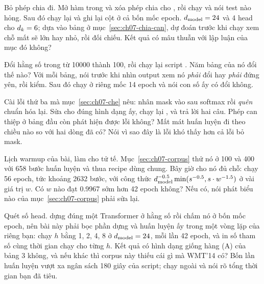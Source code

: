 \begin{bt}
  \item Bỏ phép chia đi. Mở hàm  trong
     và xóa phép chia cho , rồi
    chạy  và nói test nào hỏng.
    Sau đó chạy lại  và ghi lại cột  ở cả bốn
    mốc epoch. \(d_{\mathrm{model}} = 24\) và 4 head cho \(d_{k} = 6\); dựa vào bảng ở
    mục~\ref{sec:ch07-chia-can}, dự đoán trước khi chạy xem chỗ mất sẽ lớn hay
    nhỏ, rồi đối chiếu. Kết quả có mâu thuẫn với lập luận của mục đó không?

  \item Đổi hằng số  trong  từ 10000 thành
    100, rồi chạy lại script . Năm bảng của nó đổi thế
    nào? Với mỗi bảng, nói trước khi nhìn output xem nó \emph{phải} đổi hay
    \emph{phải} đứng yên, rồi kiểm. Sau đó chạy  ở riêng
    mốc 14 epoch và nói con số ấy có đổi không.

  \item Cài lỗi thứ ba mà mục~\ref{sec:ch07-che} nêu: nhân mask vào sau softmax
    rồi \emph{quên} chuẩn hóa lại. Sửa  cho đúng
    hình dạng ấy, chạy lại , và trả lời hai câu. Phép can
    thiệp ở bảng đầu còn phát hiện được lỗi không? Mất mát huấn luyện đi theo
    chiều nào so với hai dòng đã có? Nói vì sao đây là lỗi khó thấy hơn cả lỗi
    bỏ mask.

  \item Lịch warmup của bài, làm cho tử tế. Mục~\ref{sec:ch07-corpus} thử nó ở
     100 và 400 với 658 bước huấn luyện và thua recipe dùng chung.
    Bây giờ cho nó đủ chỗ: chạy 56 epoch, tức khoảng 2632 bước, với công thức
    \(d_{\mathrm{model}}^{-0.5}\min(s^{-0.5}, s \cdot w^{-1.5})\) ở vài giá trị \(w\). Có
    \(w\) nào đạt 0.9967 sớm hơn 42 epoch không? Nếu có, nói phát biểu nào của
    mục~\ref{sec:ch07-corpus} phải sửa lại.

  \item Quét số head.  dựng đúng một Transformer ở hằng
    số  rồi chấm nó ở bốn mốc epoch, nên bài này phải bọc phần
    dựng và huấn luyện ấy trong một vòng lặp của riêng bạn: chạy \(h\) bằng 1,
    2, 4, 8 ở \(d_{\mathrm{model}} = 24\), mỗi lần 42 epoch, và in số tham số cùng thời
    gian chạy cho từng \(h\). Kết quả có hình dạng giống hàng (A) của bảng 3
    không, và nếu khác thì corpus này thiếu cái gì mà WMT'14 có? Bốn lần huấn
    luyện vượt xa ngân sách 180 giây của script; chạy ngoài  và
    nói rõ tổng thời gian bạn đã tiêu.
\end{bt}

